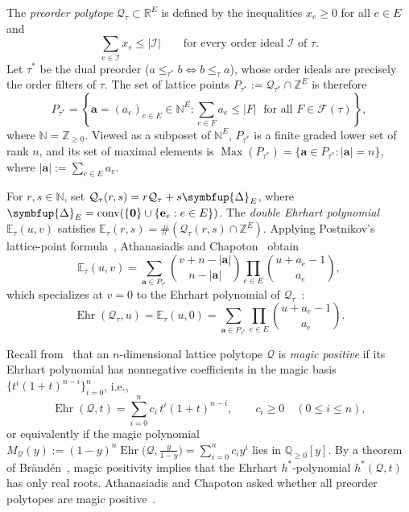 \documentclass[11pt,letterpaper]{article}
\theoremstyle{result}
\theoremstyle{definition}
\theoremstyle{remark}
\newcommand{\NN}{\mathbb{N}}
\newcommand{\ZZ}{\mathbb{Z}}
\newcommand{\QQ}{\mathbb{Q}}
\newcommand{\RR}{\mathbb{R}}
\newcommand{\biE}{\mathbb{E}}
\newcommand{\qQ}{\mathcal{Q}}
\newcommand{\fF}{\mathcal{F}}
\newcommand{\iI}{\mathcal{I}}
\newcommand{\bDelta}{\symbfup{\Delta}}
\newcommand{\Ehr}{\operatorname{Ehr}}
\newcommand{\Max}{\operatorname{Max}}
\begin{document}
The \emph{preorder polytope} $\qQ_\tau\subset\RR^E$ is defined by the inequalities $x_e\ge 0$ for all $e\in E$ and
\[
\sum_{e\in\iI} x_e \le |\iI|
\qquad\text{for every order ideal $\iI$ of $\tau$.}
\]
Let $\tau^*$ be the dual preorder ($a\le_{\tau^*} b \iff b\le_\tau a$), whose order ideals are precisely the order filters of $\tau$. The set of lattice points $P_{\tau^*}:=\qQ_{\tau^*}\cap\ZZ^E$ is therefore
\begin{equation}\label{eq:Ptaustar}
P_{\tau^*} = \left\{\mathbf{a}=(a_e)_{e\in E}\in\NN^E : \sum_{e\in F} a_e \le |F|\;\text{ for all } F\in\fF(\tau)\right\},
\end{equation}
where $\NN=\ZZ_{\ge 0}$. Viewed as a subposet of $\NN^E$, $P_{\tau^*}$ is a finite graded lower set of rank $n$, and its set of maximal elements is $\Max(P_{\tau^*})=\{\mathbf{a}\in P_{\tau^*} : |\mathbf{a}|=n\}$, where $|\mathbf{a}|:=\sum_{e\in E} a_e$.

For $r,s\in\NN$, set $\qQ_\tau(r,s)=r\qQ_\tau+s\bDelta_E$, where $\bDelta_E=\operatorname{conv}(\{\mathbf{0}\}\cup\{\mathbf{e}_e:e\in E\})$. The \emph{double Ehrhart polynomial} $\biE_\tau(u,v)$ satisfies $\biE_\tau(r,s)=\#(\qQ_\tau(r,s)\cap\ZZ^E)$. Applying Postnikov's lattice-point formula~\cite[Theorem~11.3]{Pos09}, Athanasiadis and Chapoton~\cite[Proposition~7.1, Eq.~(25)]{AC26} obtain
\begin{equation}\label{eq:biE-draco}
\biE_\tau(u,v) = \sum_{\mathbf{a}\in P_{\tau^*}} \binom{v+n-|\mathbf{a}|}{n-|\mathbf{a}|}\prod_{e\in E}\binom{u+a_e-1}{a_e},
\end{equation}
which specializes at $v=0$ to the Ehrhart polynomial of $\qQ_\tau$~\cite[Theorem~1.5(a)]{AC26}:
\begin{equation}\label{eq:Ehr-draco}
\Ehr(\qQ_\tau, u) = \biE_\tau(u,0) = \sum_{\mathbf{a}\in P_{\tau^*}} \prod_{e\in E}\binom{u+a_e-1}{a_e}.
\end{equation}

Recall from~\cite{FH24} that an $n$-dimensional lattice polytope $\qQ$ is \emph{magic positive} if its Ehrhart polynomial has nonnegative coefficients in the magic basis $\{t^i(1+t)^{n-i}\}_{i=0}^n$, i.e.,
\[
\Ehr(\qQ, t) = \sum_{i=0}^n c_i\, t^i(1+t)^{n-i}, \qquad c_i\ge 0 \quad (0\le i\le n),
\]
or equivalently if the magic polynomial $M_{\qQ}(y):=(1-y)^n\Ehr\bigl(\qQ,\frac{y}{1-y}\bigr)=\sum_{i=0}^n c_i y^i$ lies in $\QQ_{\ge 0}[y]$. By a theorem of Br\"and\'en~\cite[Theorem~4.2]{Bra06}, magic positivity implies that the Ehrhart $h^*$-polynomial $h^*(\qQ,t)$ has only real roots. Athanasiadis and Chapoton asked whether all preorder polytopes are magic positive~\cite[Conjecture~4.8]{AC26}.
\end{document}
